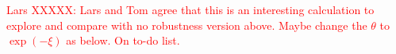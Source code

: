 \documentclass[12pt]{article}
\begin{document}
\textcolor{red}{Lars XXXXX: Lars and Tom agree that this is an interesting calculation to explore and compare with no robustness version above.
Maybe change the $\theta $ to $\exp(-\xi)$ as below. On to-do list.  }


%
%


%
%
%
%
%
%
%
%
\end{document}
